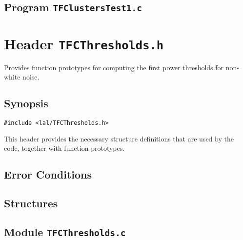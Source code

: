 \newpage
\subsection{Program \texttt{TFClustersTest1.c}}



\newpage
\section{Header \texttt{TFCThresholds.h}}
\label{s:TFCThresholds.h}

\noindent Provides function prototypes for computing the first power thresholds for non-white noise.

\subsection*{Synopsis}
\begin{verbatim}
#include <lal/TFCThresholds.h>
\end{verbatim}

\noindent This header provides the necessary structure definitions that are used by the code, together with function prototypes.


\subsection*{Error Conditions}


\newpage
\subsection*{Structures}


\newpage
\subsection{Module \texttt{TFCThresholds.c}}
\label{ss:TFCThresholds.c}


